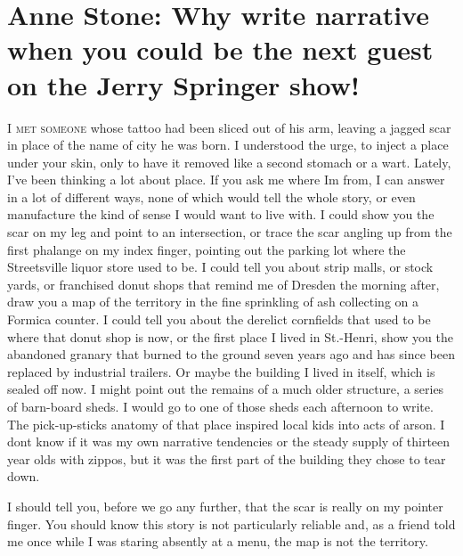 \documentclass[
]{memoir}
\begin{document}
\hypertarget{anne-stone-why-write-narrative-when-you-could-be-the-next-guest-on-the-jerry-springer-show}{%
\chapter{Anne Stone: Why write narrative when you could be the next
guest on the Jerry Springer
show!}\label{anne-stone-why-write-narrative-when-you-could-be-the-next-guest-on-the-jerry-springer-show}}

\lettrine[lines=3, findent=0em, nindent=0.1em, lhang=0]{I}{ met someone}
whose tattoo had been sliced out of his arm, leaving a jagged scar in
place of the name of city he was born. I understood the urge, to inject
a place under your skin, only to have it removed like a second stomach
or a wart. Lately, I've been thinking a lot about place. If you ask me
where Im from, I can answer in a lot of different ways, none of which
would tell the whole story, or even manufacture the kind of sense I
would want to live with. I could show you the scar on my leg and point
to an intersection, or trace the scar angling up from the first phalange
on my index finger, pointing out the parking lot where the Streetsville
liquor store used to be. I could tell you about strip malls, or stock
yards, or franchised donut shops that remind me of Dresden the morning
after, draw you a map of the territory in the fine sprinkling of ash
collecting on a Formica counter. I could tell you about the derelict
cornfields that used to be where that donut shop is now, or the first
place I lived in St.-Henri, show you the abandoned granary that burned
to the ground seven years ago and has since been replaced by industrial
trailers. Or maybe the building I lived in itself, which is sealed off
now. I might point out the remains of a much older structure, a series
of barn-board sheds. I would go to one of those sheds each afternoon to
write. The pick-up-sticks anatomy of that place inspired local kids into
acts of arson. I dont know if it was my own narrative tendencies or the
steady supply of thirteen year olds with zippos, but it was the first
part of the building they chose to tear down.

I should tell you, before we go any further, that the scar is really on
my pointer finger. You should know this story is not particularly
reliable and, as a friend told me once while I was staring absently at a
menu, the map is not the territory.
\end{document}
